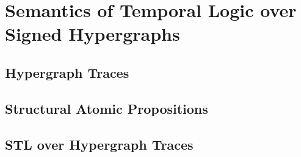 \documentclass[runningheads]{llncs}
\begin{document}
\section{Semantics of Temporal Logic over Signed Hypergraphs}
\label{sec:semantics}

\subsection{Hypergraph Traces}

\subsection{Structural Atomic Propositions}

\subsection{STL over Hypergraph Traces}
\end{document}
